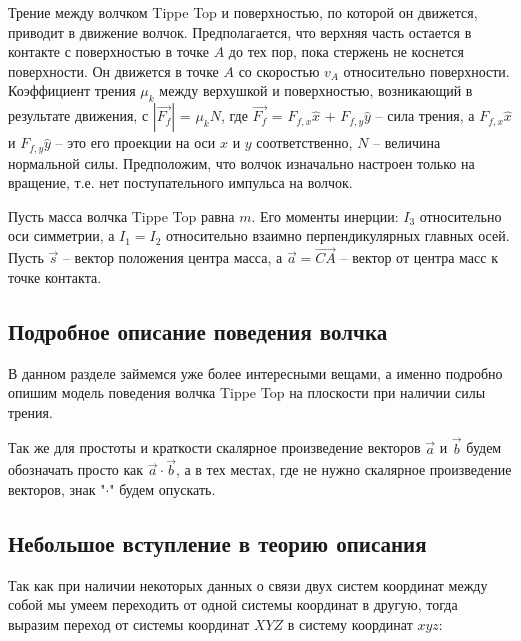 \documentclass[a4paper,11.5pt]{article} %
\begin{document}
Трение между волчком Tippe Top и поверхностью, по которой он движется, приводит в движение волчок. Предполагается, что верхняя часть остается в контакте с поверхностью в точке $A$ до тех пор, пока стержень не коснется поверхности. Он движется в точке $A$ со скоростью $v_A$ относительно поверхности. Коэффициент трения $\mu_k$ между верхушкой и поверхностью, возникающий в результате движения, с $|\overrightarrow{F_f}|$ = $\mu_kN$, где $\overrightarrow{F_f}$ = $F_{f,x} \hat{x}$ + $F_{f,y} \hat{y}$ -- сила трения, а $F_{f,x} \hat{x}$ и $F_{f,y} \hat{y}$ -- это его проекции на оси $x$ и $y$ соответственно, $N$ -- величина нормальной силы. Предположим, что волчок изначально настроен только на вращение, т.е. нет поступательного импульса на волчок.

Пусть масса волчка Tippe Top равна $m$. Его моменты инерции: $I_3$ относительно оси симметрии, а $I_1 = I_2$ относительно взаимно перпендикулярных главных осей. Пусть $\vec{s}$ -- вектор положения центра
масса, а $\vec{a} = \overrightarrow{CA}$ -- вектор от центра масс к точке контакта.

\begin{center}
	\section{Подробное описание поведения волчка}
\end{center}

В данном разделе займемся уже более интересными вещами, а именно подробно опишим модель поведения волчка Tippe Top на плоскости при наличии силы трения.

Так же для простоты и краткости скалярное произведение векторов $\vec{a}$ и $\vec{b}$ будем обозначать просто как $\vec{a}\cdot \vec{b}$, а в тех местах, где не нужно скалярное произведение векторов, знак "$\cdot$"\textbf{ }будем опускать.

\subsection{Небольшое вступление в теорию описания}
Так как при наличии некоторых данных о связи двух систем координат между собой мы умеем переходить от одной системы координат в другую, тогда выразим переход от системы координат $XYZ$ в систему координат $xyz$:
\end{document}
